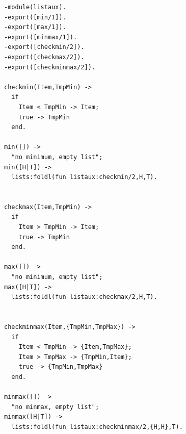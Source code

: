 \documentclass[12pt]{exam}
\begin{document}
\begin{questions}
\begin{solutionorbox}
\begin{verbatim}
-module(listaux).
-export([min/1]).
-export([max/1]).
-export([minmax/1]).
-export([checkmin/2]).
-export([checkmax/2]).
-export([checkminmax/2]).

checkmin(Item,TmpMin) ->
  if 
    Item < TmpMin -> Item;
    true -> TmpMin
  end.

min([]) ->
  "no minimum, empty list";
min([H|T]) ->
  lists:foldl(fun listaux:checkmin/2,H,T).


checkmax(Item,TmpMin) ->
  if 
    Item > TmpMin -> Item;
    true -> TmpMin
  end.

max([]) ->
  "no minimum, empty list";
max([H|T]) ->
  lists:foldl(fun listaux:checkmax/2,H,T).


checkminmax(Item,{TmpMin,TmpMax}) ->
  if 
    Item < TmpMin -> {Item,TmpMax};
    Item > TmpMax -> {TmpMin,Item};
    true -> {TmpMin,TmpMax}
  end.

minmax([]) ->
  "no minmax, empty list";
minmax([H|T]) ->
  lists:foldl(fun listaux:checkminmax/2,{H,H},T).

\end{verbatim}
\end{solutionorbox}

\question
{}
\end{questions}
\end{document}
